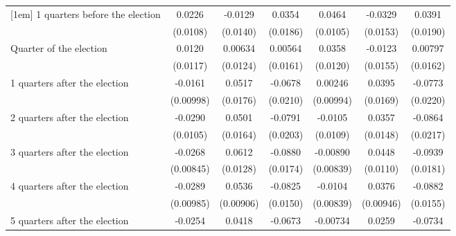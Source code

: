 \begin{table}[!ht]
\begin{tabular}{l*{6}{c}}
[1em]
 1 quarters before the election&      0.0226\sym{*}  &     -0.0129         &      0.0354         &      0.0464\sym{***}&     -0.0329\sym{*}  &      0.0391\sym{*}  \\
                    &    (0.0108)         &    (0.0140)         &    (0.0186)         &    (0.0105)         &    (0.0153)         &    (0.0190)         \\
[1em]
Quarter of the election&      0.0120         &     0.00634         &     0.00564         &      0.0358\sym{**} &     -0.0123         &     0.00797         \\
                    &    (0.0117)         &    (0.0124)         &    (0.0161)         &    (0.0120)         &    (0.0155)         &    (0.0162)         \\
[1em]
 1 quarters after the election&     -0.0161         &      0.0517\sym{**} &     -0.0678\sym{**} &     0.00246         &      0.0395\sym{*}  &     -0.0773\sym{***}\\
                    &   (0.00998)         &    (0.0176)         &    (0.0210)         &   (0.00994)         &    (0.0169)         &    (0.0220)         \\
[1em]
 2 quarters after the election&     -0.0290\sym{**} &      0.0501\sym{**} &     -0.0791\sym{***}&     -0.0105         &      0.0357\sym{*}  &     -0.0864\sym{***}\\
                    &    (0.0105)         &    (0.0164)         &    (0.0203)         &    (0.0109)         &    (0.0148)         &    (0.0217)         \\
[1em]
 3 quarters after the election&     -0.0268\sym{**} &      0.0612\sym{***}&     -0.0880\sym{***}&    -0.00890         &      0.0448\sym{***}&     -0.0939\sym{***}\\
                    &   (0.00845)         &    (0.0128)         &    (0.0174)         &   (0.00839)         &    (0.0110)         &    (0.0181)         \\
[1em]
 4 quarters after the election&     -0.0289\sym{**} &      0.0536\sym{***}&     -0.0825\sym{***}&     -0.0104         &      0.0376\sym{***}&     -0.0882\sym{***}\\
                    &   (0.00985)         &   (0.00906)         &    (0.0150)         &   (0.00839)         &   (0.00946)         &    (0.0155)         \\
[1em]
 5 quarters after the election&     -0.0254\sym{*}  &      0.0418\sym{**} &     -0.0673\sym{***}&    -0.00734         &      0.0259\sym{*}  &     -0.0734\sym{***}\\

\end{tabular}
\end{table}

